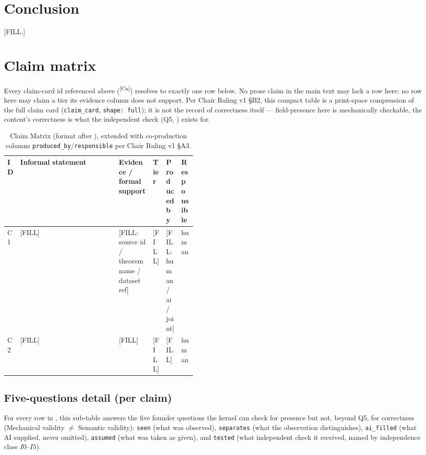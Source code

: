 \documentclass[11pt]{article}
\newcommand{\claimref}[1]{\textsuperscript{[#1]}}
\begin{document}
\section{Conclusion}
\label{sec:conclusion}
[FILL.]

\appendix

\section{Claim matrix}
\label{sec:claim-matrix}
Every claim-card id referenced above (\claimref{Cn}) resolves to exactly one
row below. No prose claim in the main text may lack a row here; no row here
may claim a tier its evidence column does not support. Per Chair Ruling v1
\S B2, this compact table is a print-space compression of the full claim
card (\texttt{claim\_card}, \texttt{shape: full}); it is not the record of
correctness itself --- field-presence here is mechanically checkable, the
content's correctness is what the independent check (Q5, ) exists for.

\begin{table}[H]
\centering
\scriptsize
\begin{tabularx}{\linewidth}{@{}p{0.04\linewidth} X p{0.18\linewidth} p{0.07\linewidth} p{0.08\linewidth} p{0.08\linewidth}@{}}
\toprule
\textbf{ID} & \textbf{Informal statement} & \textbf{Evidence / formal support} & \textbf{Tier} & \textbf{Produced by} & \textbf{Responsible} \\
\midrule
C1 & [FILL] & [FILL: source id / theorem name / dataset ref] & [FILL] & [FILL: human / ai / joint] & human \\
C2 & [FILL] & [FILL] & [FILL] & [FILL] & human \\
\bottomrule
\end{tabularx}
\caption{Claim Matrix (format after \citealp{lahtee2026zeroreadout}), extended with co-production columns \texttt{produced\_by}/\texttt{responsible} per Chair Ruling v1 \S A3.}
\label{tab:claim-matrix}
\end{table}

\subsection{Five-questions detail (per claim)}
\label{sec:five-questions}
For every row in , this sub-table answers the five
founder questions the kernel can check for presence but not, beyond Q5, for
correctness (Mechanical validity $\neq$ Semantic validity):
\texttt{seen} (what was observed), \texttt{separates} (what the observation
distinguishes), \texttt{ai\_filled} (what AI supplied, never omitted),
\texttt{assumed} (what was taken as given), and \texttt{tested}
(what independent check it received, named by independence class
\(I0\)--\(I5\)).
\end{document}
